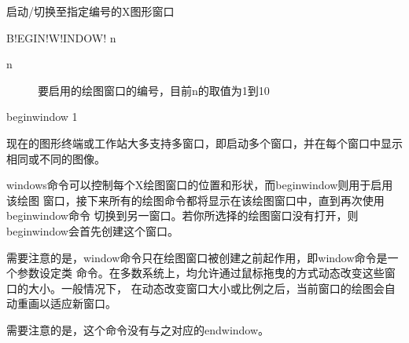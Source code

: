 \label{cmd:beginwindow}

启动/切换至指定编号的X图形窗口

\begin{SACSTX}
B!EGIN!W!INDOW! n
\end{SACSTX}

\begin{description}
\item [n] 要启用的绘图窗口的编号，目前n的取值为1到10
\end{description}

\begin{SACDFT}
beginwindow 1
\end{SACDFT}

现在的图形终端或工作站大多支持多窗口，即启动多个窗口，并在每个窗口中显示相同或不同的图像。

windows命令可以控制每个X绘图窗口的位置和形状，而beginwindow则用于启用该绘图
窗口，接下来所有的绘图命令都将显示在该绘图窗口中，直到再次使用beginwindow命令
切换到另一窗口。若你所选择的绘图窗口没有打开，则beginwindow会首先创建这个窗口。

需要注意的是，window命令只在绘图窗口被创建之前起作用，即window命令是一个参数设定类
命令。在多数系统上，均允许通过鼠标拖曳的方式动态改变这些窗口的大小。一般情况下，
在动态改变窗口大小或比例之后，当前窗口的绘图会自动重画以适应新窗口。

需要注意的是，这个命令没有与之对应的endwindow。
